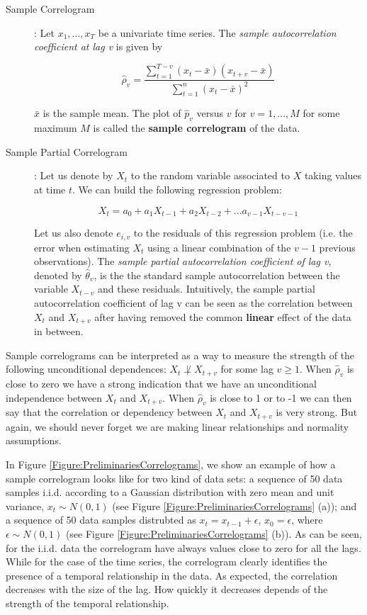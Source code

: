 \begin{description}
\item[Sample Correlogram]:  Let ${x_1,...,x_T}$ be a univariate time series. The \emph{sample autocorrelation coefficient at lag v} is given by 

$$ \hat{\rho}_v =\frac{\sum_{t=1}^{T-v} (x_t-\bar{x})(x_{t+v}-\bar{x})}{\sum_{t=1}^{n} (x_t-\bar{x})^2}$$ 

\noindent $\bar{x}$ is the sample mean. The plot of $\hat{p}_v$ versus $v$ for $v=1,...,M$ for some maximum $M$ is called the \textbf{sample correlogram} of the data.

\item[Sample Partial Correlogram]: Let us denote by $X_t$ to the random variable associated to $X$ taking values at time $t$. We can build the following regression problem:

$$ X_t = a_0 + a_1X_{t-1} + a_2X_{t-2} + ... a_{v-1}X_{t-v-1}$$

Let us also denote $e_{i,v}$ to the residuals of this regression problem (i.e. the error when estimating $X_t$ using a linear combination of the $v-1$ previous observations). The \emph{sample partial autocorrelation coefficient of lag v}, denoted by  $\hat{\theta}_v$, is the the standard sample autocorrelation between  the variable $X_{t-v}$ and these residuals. Intuitively, the sample partial autocorrelation coefficient of lag v can be seen as the correlation between $X_t$ and $X_{t+v}$ after having removed the common \textbf{linear} effect of the data in between.
\end{description}


Sample correlograms can be interpreted as a way to measure the strength of the following unconditional dependences: $X_t  \not\perp X_{t+v}$ for some lag $v\geq 1$.  When $\hat{\rho}_v$ is close to zero we have a strong indication that we have an unconditional independence between $X_t$ and $X_{t+v}$. When  $\hat{\rho}_v$ is close to 1 or to -1 we can then say that the correlation or dependency between $X_t$ and $X_{t+v}$ is very strong. But again, we should never forget we are making linear relationships and normality assumptions. 

In Figure \ref{Figure:PreliminariesCorrelograms}, we show an example of how a sample correlogram looks like for two kind of data sets:   a sequence of 50 data samples i.i.d. according to a Gaussian distribution with zero mean and unit variance, $x_t\sim N(0,1)$ (see Figure \ref{Figure:PreliminariesCorrelograms} (a));  and a sequence of 50 data samples distrubted as $x_t=x_{t-1} + \epsilon$, $x_0=\epsilon$, where $\epsilon\sim N(0,1)$ (see  Figure \ref{Figure:PreliminariesCorrelograms} (b)). As can be seen, for the i.i.d. data the correlogram have always values close to zero for all the lags. While for the case of the time series, the correlogram clearly identifies the presence of a temporal relationship in the data. As expected, the correlation decreases with the size of the lag. How quickly it decreases depends of the strength of the temporal relationship. 


